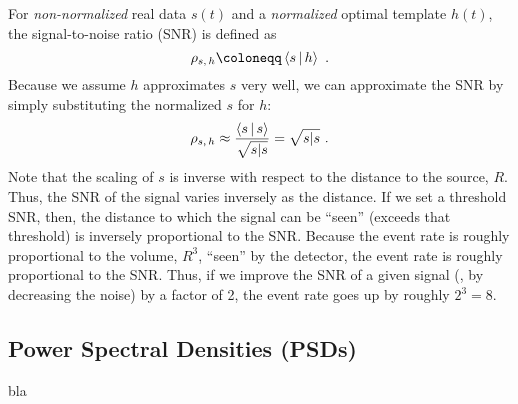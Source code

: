 \documentclass[aps, prd, amsfonts, amssymb, amsmath, %
nofootinbib]{revtex4}
\begin{document}
For \emph{non-normalized} real data $s(t)$ and a \emph{normalized}
optimal template $h(t)$, the signal-to-noise ratio (SNR) is defined as
\begin{equation}
  \label{eq:SNR}
  \rho_{s,\, h} \coloneqq \Overlap{s|h}\ .
\end{equation}
Because we assume $h$ approximates $s$ very well, we can approximate
the SNR by simply substituting the normalized $s$ for $h$:
\begin{equation}
  \label{eq:ApproxSNR}
  \rho_{s,\,h}\approx\frac{\Overlap{s|s}}{\sqrt{\InnerProduct{s|s}}} =
  \sqrt{\InnerProduct{s|s}}\ .
\end{equation}
Note that the scaling of $s$ is inverse with respect to the distance
to the source, $R$.  Thus, the SNR of the signal varies inversely as
the distance.  If we set a threshold SNR, then, the distance to which
the signal can be ``seen'' (exceeds that threshold) is inversely
proportional to the SNR.  Because the event rate is roughly
proportional to the volume, $R^{3}$, ``seen'' by the detector, the
event rate is roughly proportional to the SNR.  Thus, if we improve
the SNR of a given signal (\eg, by decreasing the noise) by a factor
of 2, the event rate goes up by roughly $2^{3}=8$.


\subsection{Power Spectral Densities (PSDs)}
\label{sec:PowerSpectralDensities}

bla






\end{document}
